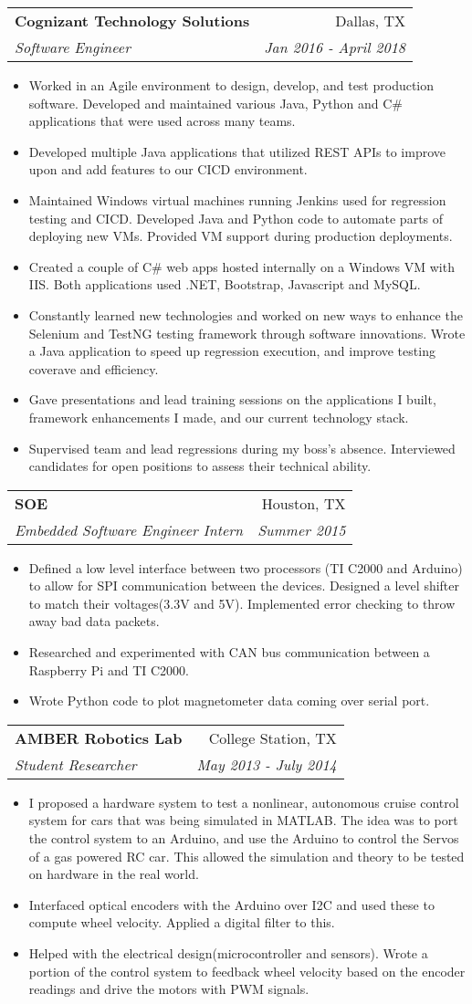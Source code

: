 \documentclass[letterpaper,11pt]{article}
\makeatletter
\newcommand{\resumeItem}[2]{
  \item\small{
    \textbf{#1}{#2 \vspace{-2pt}}
  }
}
\newcommand{\resumeSubheading}[4]{
  \vspace{-1pt}\item
    \begin{tabular*}{0.97\textwidth}[t]{l@{\extracolsep{\fill}}r}
      \textbf{#1} & #2 \\
      \textit{\small#3} & \textit{\small #4} \\
    \end{tabular*}\vspace{-5pt}
}
\newcommand{\resumeItemListStart}{\begin{itemize}}
\newcommand{\resumeItemListEnd}{\end{itemize}\vspace{-5pt}}
\makeatother
\begin{document}
    \resumeSubheading
      {Cognizant Technology Solutions}{Dallas, TX}
      {Software Engineer}{Jan 2016 - April 2018}
      \resumeItemListStart
        \resumeItem{}
          {Worked in an Agile environment to design, develop, and test production software. Developed and maintained various Java, Python and C\# applications that were used across many teams.}
        \resumeItem{}
          {Developed multiple Java applications that utilized REST APIs to improve upon and add features to our CICD environment.}
        \resumeItem{}
          {Maintained Windows virtual machines running Jenkins used for regression testing and CICD. Developed Java and Python code to automate parts of deploying new VMs. Provided VM support during production deployments.}
        \resumeItem{}
          {Created a couple of C\# web apps hosted internally on a Windows VM with IIS. Both applications used .NET, Bootstrap, Javascript and MySQL.}
        \resumeItem{}
          {Constantly learned new technologies and worked on new ways to enhance the Selenium and TestNG testing framework through software innovations. Wrote a Java application to speed up regression execution, and improve testing coverave and efficiency.}
        \resumeItem{}
          {Gave presentations and lead training sessions on the applications I built, framework enhancements I made, and our current technology stack.}
		\resumeItem{}
          {Supervised team and lead regressions during my boss’s absence. Interviewed candidates for open positions to assess their technical ability.}
      \resumeItemListEnd

    \resumeSubheading
      {SOE}{Houston, TX}
      {Embedded Software Engineer Intern}{Summer 2015}
      \resumeItemListStart
        \resumeItem{}
          {Defined a low level interface between two processors (TI C2000 and Arduino) to allow for SPI communication between the devices. Designed a level shifter to match their voltages(3.3V and 5V). Implemented error checking to throw away bad data packets.}
		\resumeItem{}
          {Researched and experimented with CAN bus communication between a Raspberry Pi and TI C2000.}
		\resumeItem{}
          {Wrote Python code to plot magnetometer data coming over serial port.}
      \resumeItemListEnd
      
    \resumeSubheading
      {AMBER Robotics Lab}{College Station, TX}
      {Student Researcher}{May 2013 - July 2014}
      \resumeItemListStart
        \resumeItem{}
          {I proposed a hardware system to test a nonlinear, autonomous cruise control system for cars that was being simulated in MATLAB. The idea was to port the control system to an Arduino, and use the Arduino to control the Servos of a gas powered RC car. This allowed the simulation and theory to be tested on hardware in the real world.}
        \resumeItem{}
          {Interfaced optical encoders with the Arduino over I2C and used these to compute wheel velocity. Applied a digital filter to this.}
		\resumeItem{}
          {Helped with the electrical design(microcontroller and sensors). Wrote a portion of the control system to feedback wheel velocity based on the encoder readings and drive the motors with PWM signals.}
      \resumeItemListEnd
\end{document}
